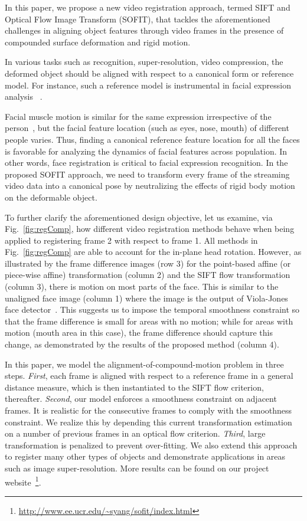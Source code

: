 \documentclass[10pt,journal]{IEEEtran}
\begin{document}
In this paper, we propose a new video registration approach, termed SIFT and Optical Flow Image Transform (SOFIT), that tackles the aforementioned challenges in aligning object features through video frames in the presence of compounded surface deformation and rigid motion.

In various tasks such as recognition, super-resolution, video compression, the deformed object should be aligned with respect to a canonical form or reference model.
For instance, such a reference model is instrumental in facial expression analysis ~\cite{Yang_SMCB12}.

Facial muscle motion is similar for the same expression irrespective of the person~\cite{Ekman78}, but the facial feature location (such as eyes, nose, mouth) of different people varies. Thus, finding a canonical reference feature location for all the faces is favorable for analyzing the dynamics of facial features across population. In other words, face registration is critical to facial expression recognition. In the proposed SOFIT approach, we need to transform every frame of the streaming video data into a canonical pose by neutralizing the effects of rigid body motion on the deformable object.

To further clarify the aforementioned design objective, let us examine, via Fig.~\ref{fig:regComp}, how different video registration methods behave when being applied to registering frame 2 with respect to frame 1.  All methods in Fig.~\ref{fig:regComp} are able to account for the in-plane head rotation. However, as illustrated by the frame difference images (row 3) for the point-based affine (or piece-wise affine) transformation (column 2) and the SIFT flow transformation (column 3), there is motion on most parts of the face. This is similar to the unaligned face image (column 1) where the image is the output of Viola-Jones face detector~\cite{Viola_IJCV04}. This suggests us to impose the temporal smoothness constraint so that the frame difference is small for areas with no motion; while for areas with motion (mouth area in this case), the frame difference should capture this change, as demonstrated by the results of the proposed method (column 4).

In this paper, we model the alignment-of-compound-motion problem in three steps. \textit{First}, each frame is aligned with respect to a reference frame in a general distance measure, which is then instantiated to the SIFT flow criterion, thereafter. \textit{Second}, our model enforces a smoothness constraint on adjacent frames. It is realistic for the consecutive frames to comply with the smoothness constraint. We realize this by depending this current transformation estimation on a number of previous frames in an optical flow criterion. \textit{Third}, large transformation is penalized to prevent over-fitting. We also extend this approach to register many other types of objects and demonstrate applications in areas such as image super-resolution. More results can be found on our project website~\footnote{\url{http://www.ee.ucr.edu/~syang/sofit/index.html}}.
\end{document}
